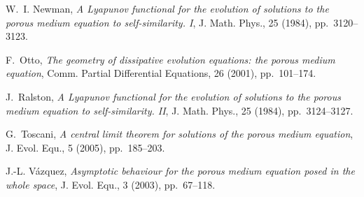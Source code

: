 \begin{thebibliography}{10}
{\sc W.~I. Newman}, {\em A {L}yapunov functional for the evolution of solutions
  to the porous medium equation to self-similarity. {I}}, J. Math. Phys., 25
  (1984), pp.~3120--3123.

{\sc F.~Otto}, {\em The geometry of dissipative evolution equations: the porous
  medium equation}, Comm. Partial Differential Equations, 26 (2001),
  pp.~101--174.

{\sc J.~Ralston}, {\em A {L}yapunov functional for the evolution of solutions
  to the porous medium equation to self-similarity. {II}}, J. Math. Phys., 25
  (1984), pp.~3124--3127.

{\sc G.~Toscani}, {\em A central limit theorem for solutions of the porous
  medium equation}, J. Evol. Equ., 5 (2005), pp.~185--203.

{\sc J.-L. {V}{\'a}zquez}, {\em Asymptotic behaviour for the porous medium
  equation posed in the whole space}, J. Evol. Equ., 3 (2003), pp.~67--118.

\end{thebibliography}



